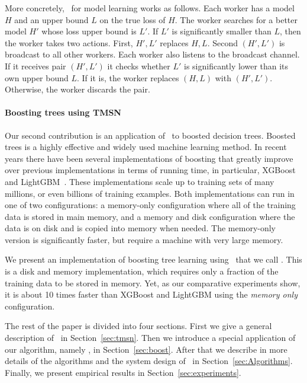 More concretely, \tmsn\ for model learning works as follows. Each
worker has a model $H$ and an upper bound $L$ on the true loss of
$H$. The worker searches for a better model $H'$ whose loss upper
bound is $L'$. If $L'$ is significantly smaller than $L$, then the
worker takes two actions. First, $H',L'$ replaces $H,L$. Second
$(H',L')$ is broadcast to all other workers.  Each worker also listens
to the broadcast channel. If it receives pair $(H',L')$ it checks
whether $L'$ is significantly lower than its own upper bound $L$. If
it is, the worker replaces $(H,L)$ with $(H',L')$. Otherwise, the worker discards the
pair.

\paragraph{Boosting trees using TMSN}
Our second contribution is an application of \tmsn\ to boosted
decision trees. Boosted trees is a highly effective and widely used
machine learning method. In recent years there have been several
implementations of boosting that greatly improve over previous
implementations in terms of running time, in particular,
XGBoost~\cite{chen_xgboost:_2016} and
LightGBM~\cite{ke_lightgbm:_2017}. These implementations scale up to
training sets of many millions, or even billions of training examples.
Both implementations can run in one of two configurations: a
memory-only configuration where all of the training data is stored in
main memory, and a memory and disk configuration where the data is on
disk and is copied into memory when needed. The memory-only version is
significantly faster, but require a machine with very large
memory.

We present an implementation of boosting tree learning using
\tmsn\ that we call \Sparrow. This is a disk and memory
implementation, which requires only a fraction of the training data to
be stored in memory.  Yet, as our comparative experiments show, it is
about 10 times faster than XGBoost and LightGBM using the {\em memory
  only} configuration.

The rest of the paper is divided into four sections.
First we give a general description of \tmsn\ in Section~\ref{sec:tmsn}.
Then we introduce a special application of our algorithm, namely \Sparrow, in Section~\ref{sec:boost}.
After that we describe in more details of the algorithms and the system design of \Sparrow\ in
Section~\ref{sec:Algorithms}.
Finally, we present empirical results in Section~\ref{sec:experiments}.
\fi
